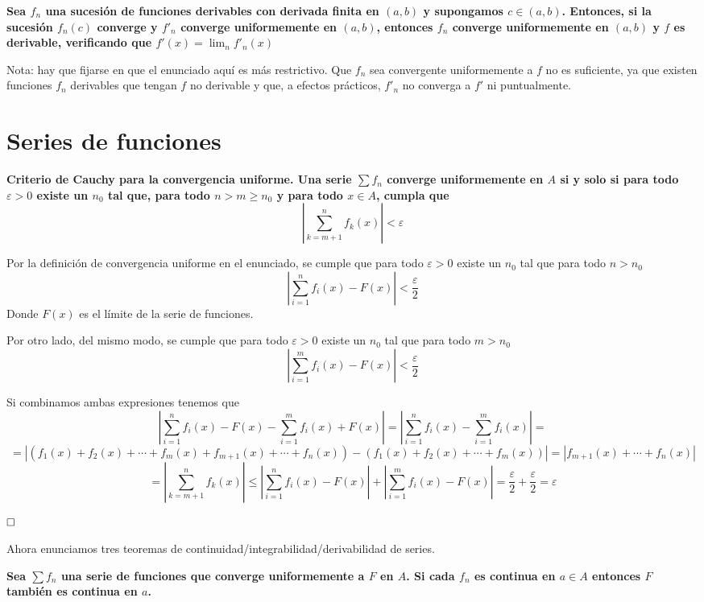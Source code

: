 \documentclass[a4paper]{article}
\newcommand{\qed}{\begin{flushright}
		{$\newline\square$}
	\end{flushright}}
\begin{document}
\textbf{Sea $f_n$ una sucesión de funciones derivables con derivada finita en $(a,b)$ y supongamos $c\in (a,b)$. Entonces, si la sucesión $f_n(c)$ converge y $f'_n$ converge uniformemente en $(a,b)$, entonces $f_n$ converge uniformemente en $(a,b)$ y $f$ es derivable, verificando que $f'(x) = \lim_n f'_n(x)$}

Nota: hay que fijarse en que el enunciado aquí es más restrictivo. Que $f_n$ sea convergente uniformemente a $f$ no es suficiente, ya que existen funciones $f_n$ derivables que tengan $f$ no derivable y que, a efectos prácticos, $f'_n$ no converga a $f'$ ni puntualmente.




\section{Series de funciones}
\textbf{Criterio de Cauchy para la convergencia uniforme. Una serie $\sum f_n$ converge uniformemente en $A$ si y solo si para todo $\varepsilon > 0$ existe un $n_0$ tal que, para todo $n>m\ge n_0$ y para todo $x\in A$, cumpla que}
$$\left| \sum^n_{k = m+1} f_k(x) \right| < \varepsilon$$ 


Por la definición de convergencia uniforme en el enunciado, se cumple que para todo $\varepsilon> 0$ existe un $n_0$ tal que para todo $n > n_0$ 
$$\left| \sum^n_{i = 1} f_i(x) - F(x)\right| < \frac{\varepsilon}{2}$$ 
Donde $F(x)$ es el límite de la serie de funciones. 

Por otro lado, del mismo modo, se cumple que para todo $\varepsilon> 0$ existe un $n_0$ tal que para todo $m > n_0$ 
$$\left| \sum^m_{i = 1} f_i(x) - F(x)\right| < \frac{\varepsilon}{2}$$ 

Si combinamos ambas expresiones tenemos que 
$$\left| \sum^n_{i = 1} f_i(x) - F(x) -  \sum^m_{i = 1} f_i(x) + F(x)\right| = \left| \sum^n_{i = 1} f_i(x) -  \sum^m_{i = 1} f_i(x) \right| = $$$$= \left| (f_1(x)+ f_2(x) + \cdots + f_m(x) + f_{m+1}(x) + \cdots + f_n(x)) - (f_1(x)+ f_2(x) + \cdots + f_m(x))\right| = 
\left|  f_{m+1}(x) + \cdots + f_n(x)\right| $$$$ =
\left| \sum^n_{k = m+1} f_k(x) \right| \le \left| \sum^n_{i = 1} f_i(x) - F(x)\right| + \left| \sum^m_{i = 1} f_i(x) - F(x)\right| = \frac{\varepsilon}{2}+\frac{\varepsilon}{2} = \varepsilon$$\qed

Ahora enunciamos tres teoremas de continuidad/integrabilidad/derivabilidad de series.

\textbf{Sea $\sum f_n$ una serie de funciones que converge uniformemente a $F$ en $A$. Si cada $f_n$ es continua en $a\in A$ entonces $F$ también es continua en $a$.}
\end{document}
